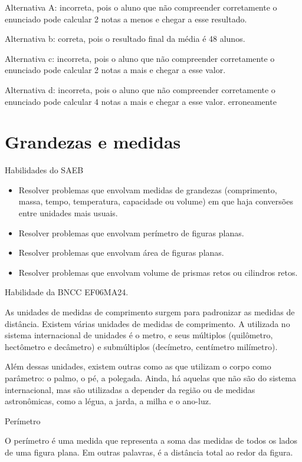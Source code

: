 Alternativa A: incorreta, pois o aluno que não compreender corretamente
o enunciado pode calcular 2 notas a menos e chegar a esse resultado.

Alternativa b: correta, pois o resultado final da média é 48 alunos.

Alternativa c: incorreta, pois o aluno que não compreender corretamente
o enunciado pode calcular 2 notas a mais e chegar a esse valor.

Alternativa d: incorreta, pois o aluno que não compreender corretamente
o enunciado pode calcular 4 notas a mais e chegar a esse valor.
erroneamente

\chapter{Grandezas e medidas}

Habilidades do SAEB

\begin{itemize}
\item
  Resolver problemas que envolvam medidas de grandezas (comprimento,
  massa, tempo, temperatura, capacidade ou volume) em que haja
  conversões entre unidades mais usuais.
\item
  Resolver problemas que envolvam perímetro de figuras planas.
\item
  Resolver problemas que envolvam área de figuras planas.
\item
  Resolver problemas que envolvam volume de prismas retos ou cilindros
  retos.
\end{itemize}

Habilidade da BNCC EF06MA24.

As unidades de medidas de comprimento surgem para padronizar as medidas
de distância. Existem várias unidades de medidas de comprimento. A
utilizada no sistema internacional de unidades é o metro, e seus
múltiplos (quilômetro, hectômetro e decâmetro) e submúltiplos
(decímetro, centímetro milímetro).

Além dessas unidades, existem outras como as que utilizam o corpo como
parâmetro: o palmo, o pé, a polegada. Ainda, há aquelas que não são do
sistema internacional, mas são utilizadas a depender da região ou de
medidas astronômicas, como a légua, a jarda, a milha e o ano-luz.

Perímetro

O perímetro é uma medida que representa a soma das medidas de todos os
lados de uma figura plana. Em outras palavras, é a distância total ao
redor da figura.

